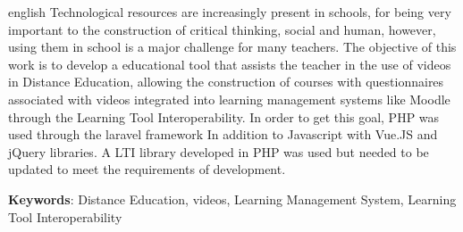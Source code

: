 \begin{resumo}[Abstract]
 \begin{otherlanguage*}{english}
Technological resources are increasingly present in schools, for being very important to the construction of critical thinking, social and human, however, using them in school is a major challenge for many teachers. The objective of this work is to develop a educational tool that assists the teacher in the use of videos in Distance Education, allowing the construction of courses with questionnaires associated with videos integrated into learning management systems like Moodle through the Learning Tool Interoperability. In order to get this goal, PHP was used through the laravel framework In addition to Javascript with Vue.JS and jQuery libraries. A LTI library developed in PHP was used but needed to be updated to meet the requirements of development.

\vspace{\onelineskip}

\noindent
\textbf{Keywords}: Distance Education, videos, Learning Management System, Learning Tool Interoperability
 \end{otherlanguage*}
\end{resumo}
